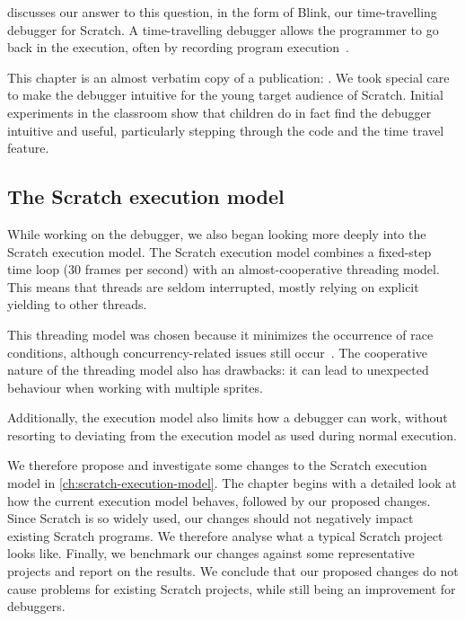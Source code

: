 \documentclass[../main]{subfiles}
\begin{document}
 discusses our answer to this question, in the form of Blink, our time-travelling debugger for Scratch.
A time-travelling debugger allows the programmer to go back in the execution, often by recording program execution~\autocite{barrTardisAffordableTimetravel2014,barrTimetravelDebuggingJavaScript2016,czaplickiAsynchronousFunctionalReactive2013,balzerEXDAMSExtendableDebugging1969,ungarDebuggingExperienceImmediacy1997,chenReversibleDebuggingUsing2001,crescenziReversibleExecutionVisualization2000}.

This chapter is an almost verbatim copy of a publication: \textcite{strijbolBlinkEducationalSoftware2024}.
We took special care to make the debugger intuitive for the young target audience of Scratch.
Initial experiments in the classroom show that children do in fact find the debugger intuitive and useful, particularly stepping through the code and the time travel feature.

\subsection{The Scratch execution model}\label{subsec:the-scratch-execution-model}

While working on the debugger, we also began looking more deeply into the Scratch execution model.
The Scratch execution model combines a fixed-step time loop (30 frames per second) with an almost-cooperative threading model.
This means that threads are seldom interrupted, mostly relying on explicit yielding to other threads.

This threading model was chosen because it minimizes the occurrence of race conditions, although concurrency-related issues still occur~\autocite{maloneyScratchProgrammingLanguage2010}.
The cooperative nature of the threading model also has drawbacks: it can lead to unexpected behaviour when working with multiple sprites.

Additionally, the execution model also limits how a debugger can work, without resorting to deviating from the execution model as used during normal execution.

We therefore propose and investigate some changes to the Scratch execution model in \cref{ch:scratch-execution-model}.
The chapter begins with a detailed look at how the current execution model behaves, followed by our proposed changes.
Since Scratch is so widely used, our changes should not negatively impact existing Scratch programs.
We therefore analyse what a typical Scratch project looks like.
Finally, we benchmark our changes against some representative projects and report on the results.
We conclude that our proposed changes do not cause problems for existing Scratch projects, while still being an improvement for debuggers.
\end{document}
